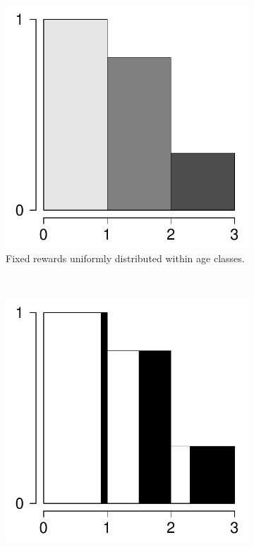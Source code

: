 \documentclass[a4paper]{article}
\begin{document}
\begin{figure}
\centering
    \begin{subfigure}[b]{0.4\textwidth}
        \includegraphics[scale=.5]{Figures/fixedflat.pdf}
        \caption{Fixed rewards uniformly distributed within age classes.}
        \label{fig:c1}
    \end{subfigure}
    ~ 
    \begin{subfigure}[b]{0.4\textwidth}
        \includegraphics[scale=.5]{Figures/fixedbars.pdf}

\end{subfigure}
\end{figure}
\end{document}
